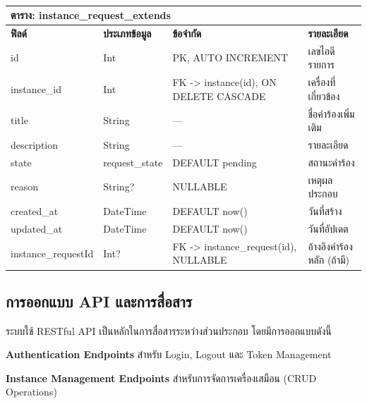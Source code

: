 \begin{table}[htbp]
    \caption{}\label{tab3:instance_request_extends_fields}
    \centering
    \renewcommand{\arraystretch}{1.2}
    \small
    \begin{tabular}{p{} p{} p{} p{}}
        \hline
        \multicolumn{4}{l}{\textbf{ตาราง: instance\_request\_extends}} \\
        \hline
            \textbf{ฟิลด์} & \textbf{ประเภทข้อมูล} & \textbf{ข้อจำกัด} & \textbf{รายละเอียด} \\
        \hline
        id & Int & PK, AUTO INCREMENT & เลขไอดีรายการ \\
        instance\_id & Int & FK -> instance(id), ON DELETE CASCADE & เครื่องที่เกี่ยวข้อง \\
        title & String & — & ชื่อคำร้องเพิ่มเติม \\
        description & String & — & รายละเอียด \\
        state & request\_state & DEFAULT pending & สถานะคำร้อง \\
        reason & String? & NULLABLE & เหตุผลประกอบ \\
        created\_at & DateTime & DEFAULT now() & วันที่สร้าง \\
        updated\_at & DateTime & DEFAULT now() & วันที่อัปเดต \\
        instance\_requestId & Int? & FK -> instance\_request(id), NULLABLE & อ้างอิงคำร้องหลัก (ถ้ามี) \\
        \hline
    \end{tabular}
\end{table}

\subsection{การออกแบบ API และการสื่อสาร}

\hspace*{1.5em} %
ระบบใช้ RESTful API เป็นหลักในการสื่อสารระหว่างส่วนประกอบ โดยมีการออกแบบดังนี้
\begin{mycustomitem}
    \item \textbf{Authentication Endpoints} สำหรับ Login, Logout และ Token Management
    \item \textbf{Instance Management Endpoints} สำหรับการจัดการเครื่องเสมือน (CRUD Operations)
\end{mycustomitem}

